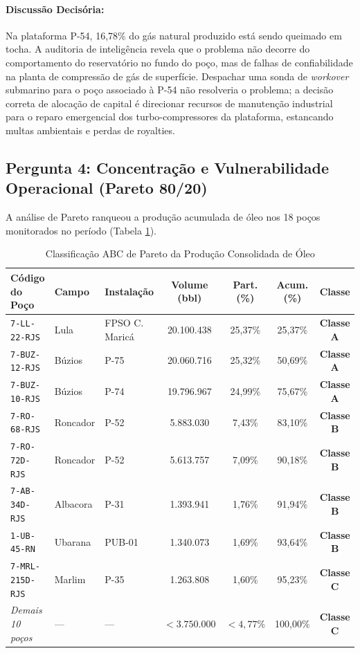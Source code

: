 \documentclass[12pt,a4paper]{article}
\begin{document}
\paragraph{Discussão Decisória:} Na plataforma P-54, 16,78\% do gás natural produzido está sendo queimado em tocha. A auditoria de inteligência revela que o problema não decorre do comportamento do reservatório no fundo do poço, mas de falhas de confiabilidade na planta de compressão de gás de superfície. Despachar uma sonda de \textit{workover} submarino para o poço associado à P-54 não resolveria o problema; a decisão correta de alocação de capital é direcionar recursos de manutenção industrial para o reparo emergencial dos turbo-compressores da plataforma, estancando multas ambientais e perdas de royalties.

\subsection{Pergunta 4: Concentração e Vulnerabilidade Operacional (Pareto 80/20)}
A análise de Pareto ranqueou a produção acumulada de óleo nos 18 poços monitorados no período (Tabela \ref{tab:p4}).

\begin{table}[htbp]
\centering
\small
\caption{Classificação ABC de Pareto da Produção Consolidada de Óleo}
\label{tab:p4}
\begin{tabular}{lllcccc}
\toprule
\textbf{Código do Poço} & \textbf{Campo} & \textbf{Instalação} & \textbf{Volume (bbl)} & \textbf{Part. (\%)} & \textbf{Acum. (\%)} & \textbf{Classe} \\
\midrule
\texttt{7-LL-22-RJS} & Lula & FPSO C. Maricá & 20.100.438 & 25,37\% & 25,37\% & \textbf{Classe A} \\
\texttt{7-BUZ-12-RJS} & Búzios & P-75 & 20.060.716 & 25,32\% & 50,69\% & \textbf{Classe A} \\
\texttt{7-BUZ-10-RJS} & Búzios & P-74 & 19.796.967 & 24,99\% & 75,67\% & \textbf{Classe A} \\
\texttt{7-RO-68-RJS} & Roncador & P-52 & 5.883.030 & 7,43\% & 83,10\% & \textbf{Classe B} \\
\texttt{7-RO-72D-RJS} & Roncador & P-52 & 5.613.757 & 7,09\% & 90,18\% & \textbf{Classe B} \\
\texttt{7-AB-34D-RJS} & Albacora & P-31 & 1.393.941 & 1,76\% & 91,94\% & \textbf{Classe B} \\
\texttt{1-UB-45-RN} & Ubarana & PUB-01 & 1.340.073 & 1,69\% & 93,64\% & \textbf{Classe B} \\
\texttt{7-MRL-215D-RJS} & Marlim & P-35 & 1.263.808 & 1,60\% & 95,23\% & \textbf{Classe C} \\
\textit{Demais 10 poços} & — & — & $< 3.750.000$ & $< 4,77\%$ & 100,00\% & \textbf{Classe C} \\
\bottomrule
\end{tabular}
\end{table}
\end{document}
